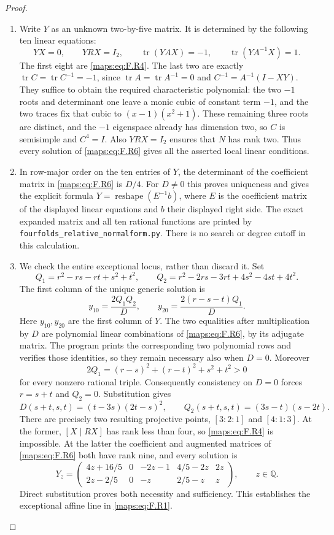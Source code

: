 \begin{proof}
\begin{enumerate}[label=\arabic*.]
\item Write $Y$ as an unknown two-by-five matrix.  It is determined
by the following ten linear equations:
\[
 YX=0,\qquad YRX=I_2,\qquad
 \operatorname{tr}(YAX)=-1,\qquad
 \operatorname{tr}(YA^{-1}X)=1.
 \tag{F.R6}\label{maps:eq:F.R6}
\]
The first eight are \eqref{maps:eq:F.R4}.  The last two are exactly
$\operatorname{tr}C=\operatorname{tr}C^{-1}=-1$, since
$\operatorname{tr}A=\operatorname{tr}A^{-1}=0$ and
$C^{-1}=A^{-1}(I-XY)$.
They suffice to obtain the required characteristic
polynomial: the two $-1$ roots and determinant one leave a
monic cubic of constant term $-1$, and the two traces fix
that cubic to $(x-1)(x^2+1)$.
These remaining three roots are distinct, and the $-1$
eigenspace already has dimension two, so $C$ is semisimple
and $C^4=I$.  Also $YRX=I_2$ ensures that $N$ has rank two.
Thus every solution of \eqref{maps:eq:F.R6} gives all the asserted local
linear conditions.

\item In row-major order on the ten entries of $Y$, the determinant
of the coefficient matrix in \eqref{maps:eq:F.R6} is $D/4$.
For $D\ne0$ this proves uniqueness and gives the explicit
formula $Y=\operatorname{reshape}(E^{-1}b)$, where $E$ is
the coefficient matrix of the displayed linear equations
and $b$ their displayed right side.
The exact expanded matrix and all ten rational functions
are printed by \texttt{fourfolds\_relative\_normalform.py}.
There is no search or degree cutoff in this calculation.

\item We check the entire exceptional locus, rather than discard it.
Set
\[
 Q_1=r^2-rs-rt+s^2+t^2,
 \qquad Q_2=r^2-2rs-3rt+4s^2-4st+4t^2.
\]
The first column of the unique generic solution is
\[
 y_{10}=\frac{2Q_1Q_2}{D},\qquad
 y_{20}=\frac{2(r-s-t)Q_1}{D}.
 \tag{F.R7}\label{maps:eq:F.R7}
\]
Here $y_{10},y_{20}$ are the first column of $Y$.
The two equalities after multiplication by $D$ are polynomial
linear combinations of \eqref{maps:eq:F.R6}, by its adjugate matrix.
The program prints the corresponding two polynomial rows
and verifies those identities, so they remain necessary
also when $D=0$.
Moreover
\[
 2Q_1=(r-s)^2+(r-t)^2+s^2+t^2>0
\]
for every nonzero rational triple.  Consequently consistency
on $D=0$ forces $r=s+t$ and $Q_2=0$.
Substitution gives
\[
 D(s+t,s,t)=(t-3s)(2t-s)^2,
 \qquad Q_2(s+t,s,t)=(3s-t)(s-2t).
 \tag{F.R8}\label{maps:eq:F.R8}
\]
There are precisely two resulting projective points,
$[3:2:1]$ and $[4:1:3]$.
At the former, $[X\mid RX]$ has rank less than four, so
\eqref{maps:eq:F.R4} is impossible.  At the latter the coefficient and
augmented matrices of \eqref{maps:eq:F.R6} both have rank nine, and every
solution is
\[
 Y_z=\begin{pmatrix}
 4z+16/5&0&-2z-1&4/5-2z&2z\\
 2z-2/5&0&-z&2/5-z&z
 \end{pmatrix},\qquad z\in\mathbb Q.
 \tag{F.R9}\label{maps:eq:F.R9}
\]
Direct substitution proves both necessity and sufficiency.
This establishes the exceptional affine line in \eqref{maps:eq:F.R1}.


\end{enumerate}
\end{proof}
